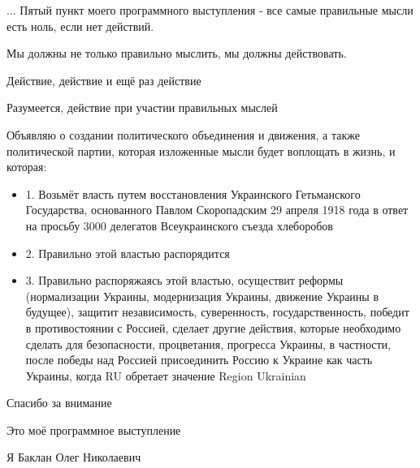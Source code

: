 ... Пятый пункт моего программного выступления - все  самые правильные мысли есть ноль, если нет действий.

Мы должны не только правильно мыслить, мы должны действовать.

Действие, действие и ещё раз действие

Разумеется, действие  при участии правильных мыслей

Объявляю о создании политического объединения и движения, а также политической
партии, которая изложенные мысли будет воплощать в жизнь, и которая:

\begin{itemize}
  \item 1. Возьмёт власть путем восстановления Украинского Гетьманского Государства, основанного Павлом Скоропадским 29 апреля 1918 года в ответ на просьбу 3000 делегатов Всеукраинского съезда хлеборобов
  \item 2. Правильно этой властью распорядится
	\item 3. Правильно распоряжаясь этой властью, осуществит реформы
	(нормализации Украины, модернизация Украины, движение Украины в будущее),
	защитит независимость, суверенность, государственность, победит в
	противостоянии с Россией, сделает другие действия, которые необходимо сделать
	для безопасности, процветания, прогресса Украины, в частности, после победы
	над Россией присоединить Россию к Украине как часть Украины, когда RU
	обретает значение Region Ukrainian
\end{itemize}

Спасибо за внимание

Это моё программное выступление

Я Баклан Олег Николаевич
